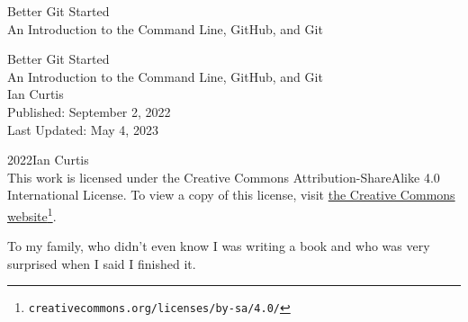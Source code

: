 \documentclass[oneside,10pt,]{book}
\newcommand{\titlepagefont}{\relax}
\begin{document}
\raggedbottom
\frontmatter
\thispagestyle{empty}
{\titlepagefont\centering
\vspace*{0.28\textheight}
{\Huge Better Git Started}\\[2\baselineskip]
{\LARGE An Introduction to the Command Line, GitHub, and Git}\\
}
\clearpage
\thispagestyle{empty}
{\titlepagefont\centering
\vspace*{0.14\textheight}
{\Huge Better Git Started}\\[\baselineskip]
{\LARGE An Introduction to the Command Line, GitHub, and Git}\\[3\baselineskip]
{\Large Ian Curtis}\\[3\baselineskip]
{\Large Published: September 2, 2022}\\[3\baselineskip]
{\Large Last Updated: May 4, 2023}\\}
\clearpage
\thispagestyle{empty}
\hypertarget{colophon-frontmatter-b}{}
\noindent\textcopyright{}2022\quad{}Ian Curtis\\[0.5\baselineskip]
This work is licensed under the Creative Commons Attribution-ShareAlike 4.0 International License. To view a copy of this license, visit \href{http://creativecommons.org/licenses/by-sa/4.0/}{the Creative Commons website}\footnote{\nolinkurl{creativecommons.org/licenses/by-sa/4.0/}\label{fn-frontmatter-b-a-c-b}}.\par\medskip
{}
\null\clearpage
\cleardoublepage
\thispagestyle{empty}
\begin{center}\Large%
To my family, who didn't even know I was writing a book and who was very surprised when I said I finished it.%
\end{center}
\clearpage
%
%
\typeout{************************************************}
\typeout{************************************************}
\end{document}
